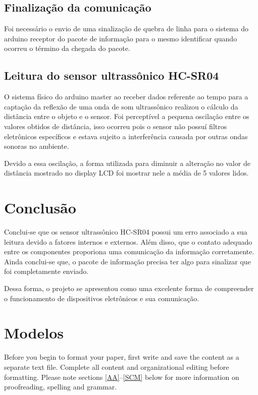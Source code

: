 \documentclass[conference]{IEEEtran}
\begin{document}
\subsection{Finalização da comunicação}
Foi necessário o envio de uma sinalização de quebra de linha para o sistema do arduino receptor do pacote de informação para o mesmo identificar quando ocorreu o término da chegada do pacote.

\subsection{Leitura do sensor ultrassônico HC-SR04}

O sistema físico do arduino master ao receber dados referente ao tempo para a captação da reflexão de uma onda de som ultrassônico realizou o cálculo da distância entre o objeto e o sensor.
Foi perceptível a pequena oscilação entre os valores obtidos de distância, isso ocorreu pois o sensor não possuí filtros eletrônicos específicos e estava sujeito a interferência causada por outras ondas sonoras no ambiente.

Devido a essa oscilação, a forma utilizada para diminuir a alteração no valor de distância mostrado no display LCD foi mostrar nele a média de 5 valores lidos.

\section{Conclusão}
Conclui-se que os sensor ultrassônico HC-SR04 possui um erro associado a sua leitura devido a fatores internos e externos.
Além disso, que o contato adequado entre os componentes proporiona uma comunicação da informação corretamente. Ainda conclui-se que, o pacote de informação precisa ter algo para sinalizar que foi completamente enviado.

Dessa forma, o projeto se apresentou como uma excelente forma de compreender o funcionamento de dispositivos eletrônicos e sua comunicação.










\section{Modelos}
Before you begin to format your paper, first write and save the content as a
separate text file. Complete all content and organizational editing before
formatting. Please note sections \ref{AA}--\ref{SCM} below for more information on
proofreading, spelling and grammar.
\end{document}
